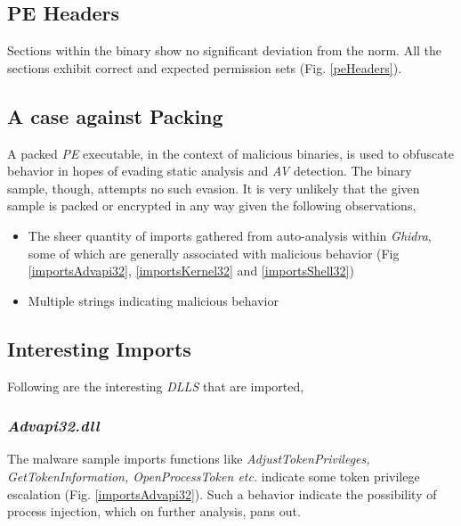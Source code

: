 \documentclass[10pt,a4paper]{article}
\begin{document}
	\subsection{PE Headers}
	Sections within the binary show no significant deviation from the norm.
	All the sections exhibit correct and expected permission sets (Fig. \ref{peHeaders}).

	\subsection{A case against Packing}
	A packed \textit{PE} executable, in the context of malicious binaries, is used to obfuscate behavior in hopes of evading static analysis and \textit{AV} detection.
	The binary sample, though, attempts no such evasion.
	It is very unlikely that the given sample is packed or encrypted in any way given the following observations,
	\begin{itemize}
	\vspace{-1em}
		\item The sheer quantity of imports gathered from auto-analysis within \textit{Ghidra}, some of which are generally associated with malicious behavior (Fig \ref{importsAdvapi32}, \ref{importsKernel32} and \ref{importsShell32})
		\item Multiple strings indicating malicious behavior 
	\end{itemize}

	\subsection{Interesting Imports}
	Following are the interesting \textit{DLLS} that are imported,
		\subsubsection*{\textit{Advapi32.dll}}
		\vspace{-1em}
		The malware sample imports functions like \textit{AdjustTokenPrivileges, GetTokenInformation, OpenProcessToken etc.} indicate some token privilege escalation (Fig. \ref{importsAdvapi32}).
		Such a behavior indicate the possibility of process injection, which on further analysis, pans out.
\end{document}
